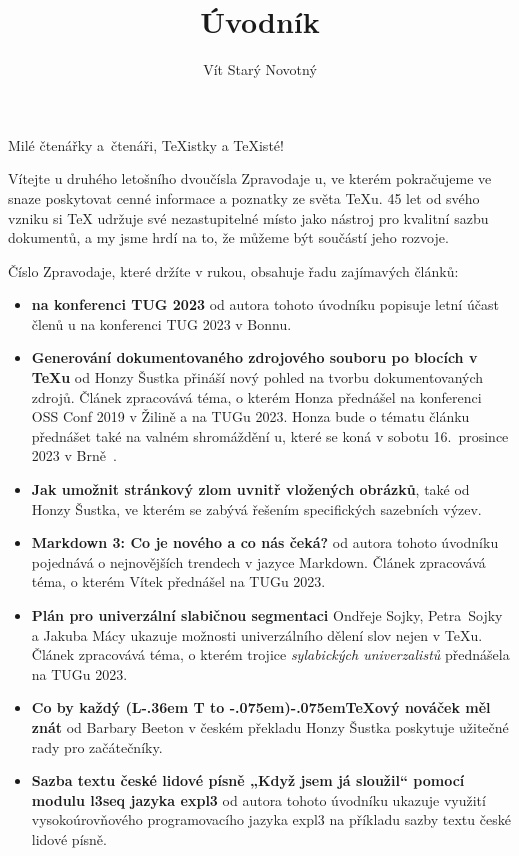\documentclass{csbulletin}
\makeatletter
\DeclareRobustCommand{\La}{L\kern-.36em%
        {\sbox\z@ T%
         \vbox to\ht\z@{\hbox{\check@mathfonts
                              \fontsize\sf@size\z@
                              \math@fontsfalse\selectfont
                              A}%
                        \vss}%
        }}
\def\AllTeX{(\La\kern-.075em)\kern-.075em\TeX}
\makeatother
\begin{document}
\title{Úvodník}
\author{Vít Starý Novotný}
\maketitle

Milé čtenářky a~čtenáři, \TeX istky a \TeX isté!

\medskip

Vítejte u druhého letošního dvoučísla Zpravodaje \CSTUG u, ve kterém pokračujeme ve snaze poskytovat cenné informace a poznatky ze světa \TeX u. 45 let od svého vzniku si \TeX{} udržuje své nezastupitelné místo jako nástroj pro kvalitní sazbu dokumentů, a my jsme hrdí na to, že můžeme být součástí jeho rozvoje.

Číslo Zpravodaje, které držíte v rukou, obsahuje řadu zajímavých článků:

\begin{itemize}
  \item \textbf{\CSTUG{} na konferenci TUG 2023} od autora tohoto úvodníku popisuje letní účast členů \CSTUG u na konferenci TUG 2023 v Bonnu.
  \item \textbf{Generování dokumentovaného zdrojového souboru po blocích v \TeX u} od Honzy Šustka přináší nový pohled na tvorbu dokumentovaných zdrojů. Článek zpracovává téma, o kterém Honza přednášel na konferenci OSS Conf 2019 v Žilině a na TUGu 2023. Honza bude o tématu článku přednášet také na valném shromáždění \CSTUG u, které se koná v sobotu 16.~prosince 2023 v Brně~\cite{starynovotny2023valna}.
  \item \textbf{Jak umožnit stránkový zlom uvnitř vložených obrázků}, také od Honzy Šustka, ve kterém se zabývá řešením specifických sazebních výzev.
  \item \textbf{Markdown 3: Co je nového a co nás čeká?} od autora tohoto úvodníku pojednává o nejnovějších trendech v jazyce Markdown. Článek zpracovává téma, o kterém Vítek přednášel na TUGu 2023.
  \item \textbf{Plán pro univerzální slabičnou segmentaci} Ondřeje Sojky, Petra~Sojky a Jakuba Mácy ukazuje možnosti univerzálního dělení slov nejen v \TeX u. Článek zpracovává téma, o kterém trojice \emph{sylabických univerzalistů} přednášela na TUGu 2023.
  \item \textbf{Co by každý \AllTeX ový nováček měl znát} od Barbary Beeton v českém překladu Honzy Šustka poskytuje užitečné rady pro začátečníky.
  \item \textbf{Sazba textu české lidové písně „Když jsem já
sloužil“ pomocí modulu l3seq jazyka expl3} od autora tohoto úvodníku ukazuje využití vysokoúrovňového programovacího jazyka expl3 na příkladu sazby textu české lidové písně.
\end{itemize}
\end{document}
